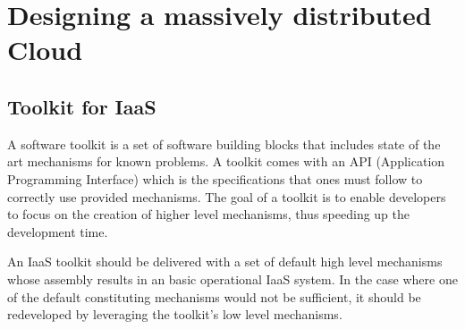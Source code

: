 \section{Designing a massively distributed Cloud}
\label{sec:design}


\subsection{Toolkit for IaaS}









A software toolkit is a set of software building blocks that includes state of 
the art mechanisms for known problems. A toolkit comes with an API (Application
Programming Interface) which is the specifications that ones must follow to
correctly use provided mechanisms. The goal of a toolkit is to enable developers
to focus on the creation of higher level mechanisms, thus speeding up the 
development time.

An IaaS toolkit should be delivered with a set of default high level mechanisms 
whose assembly results in an basic operational IaaS system. In the case where 
one of the default constituting mechanisms would not be sufficient, it should be
redeveloped by leveraging the toolkit's low level mechanisms.

